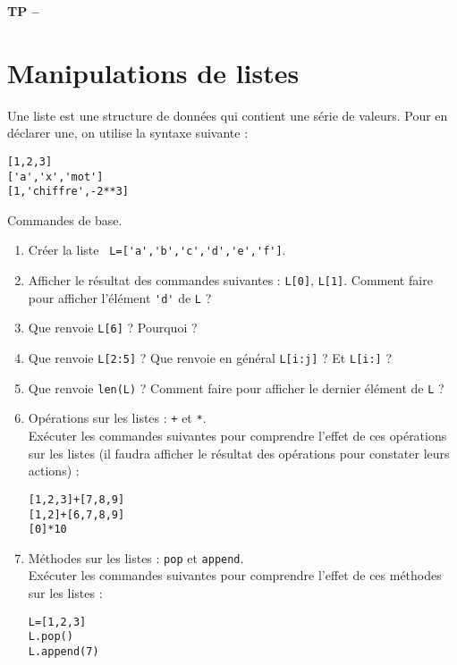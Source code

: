






\begin{center}
{\Large\bf TP \no {\numero} -- \descrip}
\end{center}



\section{Manipulations de listes}

\begin{defn}
Une liste est une structure de données qui contient une série de valeurs. Pour en déclarer une, on utilise la syntaxe suivante :
\begin{verbatim}
[1,2,3]
['a','x','mot']
[1,'chiffre',-2**3]
\end{verbatim}
\end{defn}

\begin{exercice}Commandes de base.
\begin{enumerate}
\item Créer la liste \verb? L=['a','b','c','d','e','f']?.
\item Afficher le résultat des commandes suivantes : \verb?L[0]?,  \verb?L[1]?. Comment faire pour afficher l'élément \verb?'d'? de \verb?L? ?
\item Que renvoie \verb?L[6]? ? Pourquoi ?
\item Que renvoie \verb?L[2:5]? ? Que renvoie en général \verb?L[i:j]? ? Et \verb?L[i:]? ?
\item Que renvoie \verb?len(L)? ? Comment faire pour afficher le dernier élément de \verb?L? ?
\item Opérations sur les listes : \verb?+? et \verb?*?. \\
Exécuter les commandes suivantes pour comprendre l'effet de ces opérations sur les listes (il faudra afficher le résultat des opérations pour constater leurs actions) :
\begin{verbatim}
[1,2,3]+[7,8,9]
[1,2]+[6,7,8,9]
[0]*10
\end{verbatim}
\item Méthodes sur les listes : \verb?pop? et \verb?append?.\\
Exécuter les commandes suivantes pour comprendre l'effet de ces méthodes sur les listes :
\begin{verbatim}
L=[1,2,3]
L.pop()
L.append(7)
\end{verbatim}
\end{enumerate}
\end{exercice}


